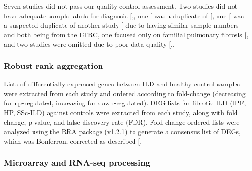 \documentclass[
]{article}
\begin{document}
Seven studies did not pass our quality control assessment. Two studies did not have adequate sample labels for diagnosis {[},\citeproc{ref-zhu_integration_2018}{184}{]}, one {[}\citeproc{ref-christmann_association_2014}{126}{]} was a duplicate of {[}\citeproc{ref-christmann_mir-155_2016}{81}{]}, one {[}\citeproc{ref-ghosh_lung_2022}{185}{]} was a suspected duplicate of another study {[}\citeproc{ref-borie_colocalization_2022}{69}{]} due to having similar sample numbers and both being from the LTRC, one focused only on familial pulmonary fibrosis {[}\citeproc{ref-el-chemaly_immunome_2018}{186}{]}, and two studies were omitted due to poor data quality {[},\citeproc{ref-zhou_integrated_2019}{187}{]}.

\subsubsection{Robust rank aggregation}\label{robust-rank-aggregation}

Lists of differentially expressed genes between ILD and healthy control samples were extracted from each study and ordered according to fold-change (decreasing for up-regulated, increasing for down-regulated). DEG lists for fibrotic ILD (IPF, HP, SSc-ILD) against controls were extracted from each study, along with fold change, p-value, and false discovery rate (FDR). Fold change-ordered lists were analyzed using the RRA package (v1.2.1) to generate a consensus list of DEGs, which was Bonferroni-corrected as described {[}\citeproc{ref-vosa_comprehensive_2014}{188}{]}.

\subsubsection{Microarray and RNA-seq processing}\label{microarray-and-rna-seq-processing}
\end{document}
